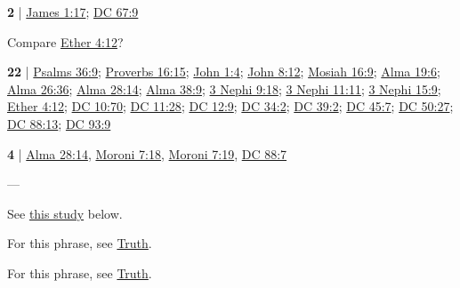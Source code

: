 	\begin{compactdesc}
	
		\item[Father of lights] \textbf{2} | \hyperref[JAMES-1-17]{James 1:17}; \hyperref[DC67-9]{DC 67:9}
			\begin{compactdesc}
				\item[Bible anchor verses] \phantom{.}
					\begin{compactdesc}
						\item[{\hyperref[JAMES-1-17]{James 1:17}}]
					\end{compactdesc}
				\item[Commentary] Compare \hyperref[ETHER-4-12]{Ether 4:12}?
			\end{compactdesc}
			
		\item[light and life] \textbf{22} | \hyperref[PSALMS-36-9]{Psalms 36:9}; \hyperref[PROVERBS-16-15]{Proverbs 16:15}; \hyperref[JOHN-1-4]{John 1:4}; \hyperref[JOHN-8-12]{John 8:12}; \hyperref[MOSIAH-16-9]{Mosiah 16:9}; \hyperref[ALMA-19-6]{Alma 19:6}; \hyperref[ALMA-26-36]{Alma 26:36}; \hyperref[ALMA-28-14]{Alma 28:14}; \hyperref[ALMA-38-9]{Alma 38:9}; \hyperref[3NEPHI-9-18]{3 Nephi 9:18}; \hyperref[3NEPHI-11-11]{3 Nephi 11:11}; \hyperref[3NEPHI-15-9]{3 Nephi 15:9}; \hyperref[ETHER-4-12]{Ether 4:12}; \hyperref[DC10-70]{DC 10:70}; \hyperref[DC11-28]{DC 11:28}; \hyperref[DC12-9]{DC 12:9}; \hyperref[DC34-2]{DC 34:2}; \hyperref[DC39-2]{DC 39:2}; \hyperref[DC45-7]{DC 45:7}; \hyperref[DC50-27]{DC 50:27}; \hyperref[DC88-13]{DC 88:13}; \hyperref[DC93-9]{DC 93:9}
	
		\item[light of Christ] \textbf{4} | \hyperref[ALMA-28-14]{Alma 28:14}, \hyperref[MORONI-7-18]{Moroni 7:18}, \hyperref[MORONI-7-19]{Moroni 7:19}, \hyperref[DC88-7]{DC 88:7}
			\begin{compactdesc}
				\item[Bible anchor verses] ---
				\item[Commentary] See \hyperref[LIGHT-christ]{this study} below.
			\end{compactdesc}
			
		\item[light and truth] For this phrase, see \hyperref[TRUTH-PHRASES]{Truth}.
		
		\item[light of truth] For this phrase, see \hyperref[TRUTH-PHRASES]{Truth}.
		
	\end{compactdesc}
	
